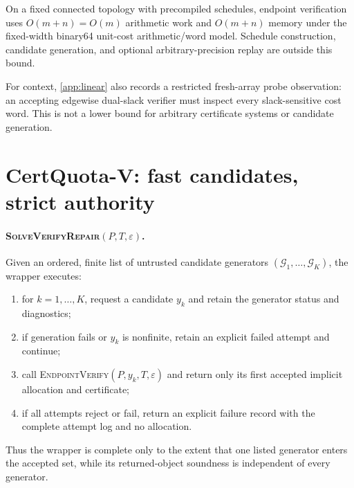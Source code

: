 \documentclass[smallextended,envcountsect]{svjour3}
\newcommand{\cG}{\mathcal{G}}
\begin{document}
\begin{theorem}
\label{thm:linear}
On a fixed connected topology with precompiled schedules, endpoint verification
uses $O(m+n)=O(m)$ arithmetic work and $O(m+n)$ memory under the fixed-width
binary64 unit-cost arithmetic/word model.  Schedule construction, candidate
generation, and optional arbitrary-precision replay are outside this bound.
\end{theorem}

For context, \cref{app:linear} also records a restricted fresh-array probe
observation: an accepting edgewise dual-slack verifier must inspect every
slack-sensitive cost word.  This is not a lower bound for arbitrary certificate
systems or candidate generation.

\section{CertQuota-V: fast candidates, strict authority}
\label{sec:algorithm}

\paragraph{\textnormal{\textsc{SolveVerifyRepair}}$(P,T,\varepsilon)$.}
Given an ordered, finite list of untrusted candidate generators
$(\cG_1,\ldots,\cG_K)$, the wrapper executes:
\begin{enumerate}[leftmargin=*,itemsep=1pt]
 \item for $k=1,\ldots,K$, request a candidate $y_k$ and retain the generator
 status and diagnostics;
 \item if generation fails or $y_k$ is nonfinite, retain an explicit failed
 attempt and continue;
 \item call \textsc{EndpointVerify}$(P,y_k,T,\varepsilon)$ and return only its
 first accepted implicit allocation and certificate;
 \item if all attempts reject or fail, return an explicit failure record with
 the complete attempt log and no allocation.
\end{enumerate}
Thus the wrapper is complete only to the extent that one listed generator enters
the accepted set, while its returned-object soundness is independent of every
generator.
\end{document}
